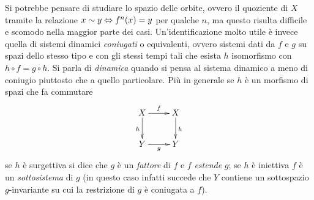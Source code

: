 Si potrebbe pensare di studiare lo spazio delle orbite, ovvero il quoziente di $X$ tramite
la relazione $x\sim y\Leftrightarrow f^n(x)=y$ per qualche $n$, 
ma questo risulta difficile e scomodo nella maggior parte dei casi. 
Un'identificazione molto utile è invece quella di sistemi dinamici \emph{coniugati} o equivalenti, 
ovvero sistemi dati da $f$ e $g$ su spazi dello stesso tipo e con gli stessi tempi tali che esista $h$ isomorfismo con $h\circ f=g\circ h$. 
Si parla di \emph{dinamica} quando si pensa al sistema dinamico a meno di coniugio piuttosto che a quello particolare. 
Più in generale se $h$ è un morfismo di spazi che fa commutare
\[ \xymatrix{ X \ar[r]^f \ar[d]_h & X \ar[d]^h \\ Y \ar[r]_g & Y } \]
se $h$ è surgettiva si dice che $g$ è un \emph{fattore} di $f$ e $f$ \emph{estende} $g$; 
se $h$ è iniettiva $f$ è un \emph{sottosistema} di $g$ (in questo caso infatti succede che $Y$ contiene un sottospazio $g$-invariante su cui la restrizione di $g$ è coniugata a $f$). 

